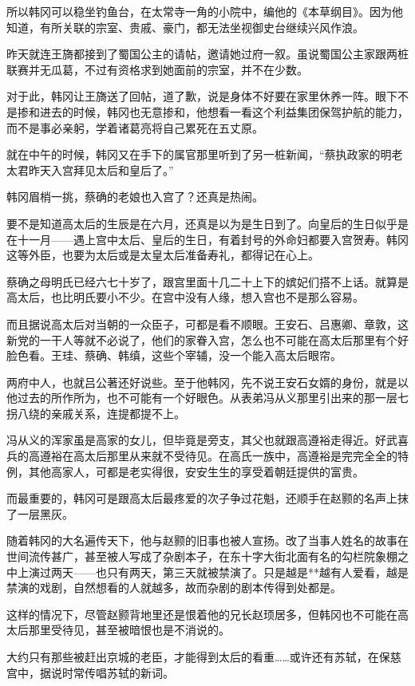 所以韩冈可以稳坐钓鱼台，在太常寺一角的小院中，编他的《本草纲目》。因为他知道，有所关联的宗室、贵戚、豪门，都无法坐视御史台继续兴风作浪。

昨天就连王旖都接到了蜀国公主的请帖，邀请她过府一叙。虽说蜀国公主家跟两桩联赛并无瓜葛，不过有资格求到她面前的宗室，并不在少数。

对于此，韩冈让王旖送了回帖，道了歉，说是身体不好要在家里休养一阵。眼下不是掺和进去的时候，韩冈也无意掺和，他想看一看这个利益集团保驾护航的能力，而不是事必亲躬，学着诸葛亮将自己累死在五丈原。

就在中午的时候，韩冈又在手下的属官那里听到了另一桩新闻，“蔡执政家的明老太君昨天入宫拜见太后和皇后了。”

韩冈眉梢一挑，蔡确的老娘也入宫了？还真是热闹。

要不是知道高太后的生辰是在六月，还真是以为是生日到了。向皇后的生日似乎是在十一月——遇上宫中太后、皇后的生日，有着封号的外命妇都要入宫贺寿。韩冈这等外臣，也要为太后或是太皇太后准备寿礼，都得记在心上。

蔡确之母明氏已经六七十岁了，跟宫里面十几二十上下的嫔妃们搭不上话。就算是高太后，也比明氏要小不少。在宫中没有人缘，想入宫也不是那么容易。

而且据说高太后对当朝的一众臣子，可都是看不顺眼。王安石、吕惠卿、章敦，这新党的一干人等就不必说了，他们的家眷入宫，怎么也不可能在高太后那里有个好脸色看。王珪、蔡确、韩缜，这些个宰辅，没一个能入高太后眼帘。

两府中人，也就吕公著还好说些。至于他韩冈，先不说王安石女婿的身份，就是以他过去的所作所为，也不可能有一个好眼色。从表弟冯从义那里引出来的那一层七拐八绕的亲戚关系，连提都提不上。

冯从义的浑家虽是高家的女儿，但毕竟是旁支，其父也就跟高遵裕走得近。好武喜兵的高遵裕在高太后那里从来就不受待见。在高氏一族中，高遵裕是完完全全的特例，其他高家人，可都是老实得很，安安生生的享受着朝廷提供的富贵。

而最重要的，韩冈可是跟高太后最疼爱的次子争过花魁，还顺手在赵颢的名声上抹了一层黑灰。

随着韩冈的大名遍传天下，他与赵颢的旧事也被人宣扬。改了当事人姓名的故事在世间流传甚广，甚至被人写成了杂剧本子，在东十字大街北面有名的勾栏院象棚之中上演过两天——也只有两天，第三天就被禁演了。只是越是**越有人爱看，越是禁演的戏剧，自然想看的人就越多，故而杂剧的剧本传得到处都是。

这样的情况下，尽管赵颢背地里还是恨着他的兄长赵顼居多，但韩冈也不可能在高太后那里受待见，甚至被暗恨也是不消说的。

大约只有那些被赶出京城的老臣，才能得到太后的看重……或许还有苏轼，在保慈宫中，据说时常传唱苏轼的新词。

